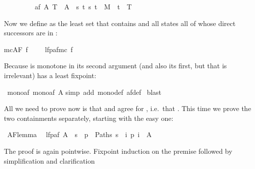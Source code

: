 \begin{isabellebody}
\ \ \ \ \ \ \ \ \ {\isachardoublequote}af\ A\ T\ {\isasymequiv}\ A\ {\isasymunion}\ {\isacharbraceleft}s{\isachardot}\ {\isasymforall}t{\isachardot}\ {\isacharparenleft}s{\isacharcomma}\ t{\isacharparenright}\ {\isasymin}\ M\ {\isasymlongrightarrow}\ t\ {\isasymin}\ T{\isacharbraceright}{\isachardoublequote}%
\begin{isamarkuptext}%
\noindent
Now we define  as the least set  that contains
 and all states all of whose direct successors are in :%
\end{isamarkuptext}%
{\isachardoublequote}mc{\isacharparenleft}AF\ f{\isacharparenright}\ \ \ \ {\isacharequal}\ lfp{\isacharparenleft}af{\isacharparenleft}mc\ f{\isacharparenright}{\isacharparenright}{\isachardoublequote}%
\begin{isamarkuptext}%
\noindent
Because  is monotone in its second argument (and also its first, but
that is irrelevant)  has a least fixpoint:%
\end{isamarkuptext}%
\ mono{\isacharunderscore}af{\isacharcolon}\ {\isachardoublequote}mono{\isacharparenleft}af\ A{\isacharparenright}{\isachardoublequote}\isanewline
{}simp\ add{\isacharcolon}\ mono{\isacharunderscore}def\ af{\isacharunderscore}def{\isacharparenright}\isanewline
{}\ blast\isanewline
{}%
\begin{isamarkuptext}%
All we need to prove now is that  and \isa{{\isasymTurnstile}}
agree for , i.e.\ that . This time we prove the two containments separately, starting
with the easy one:%
\end{isamarkuptext}%
\ AF{\isacharunderscore}lemma{}{\isacharcolon}\isanewline
\ \ {\isachardoublequote}lfp{\isacharparenleft}af\ A{\isacharparenright}\ {\isasymsubseteq}\ {\isacharbraceleft}s{\isachardot}\ {\isasymforall}\ p\ {\isasymin}\ Paths\ s{\isachardot}\ {\isasymexists}\ i{\isachardot}\ p\ i\ {\isasymin}\ A{\isacharbraceright}{\isachardoublequote}%
\begin{isamarkuptxt}%
\noindent
The proof is again pointwise. Fixpoint induction on the premise  followed
by simplification and clarification%
\end{isamarkuptxt}%

\end{isabellebody}
